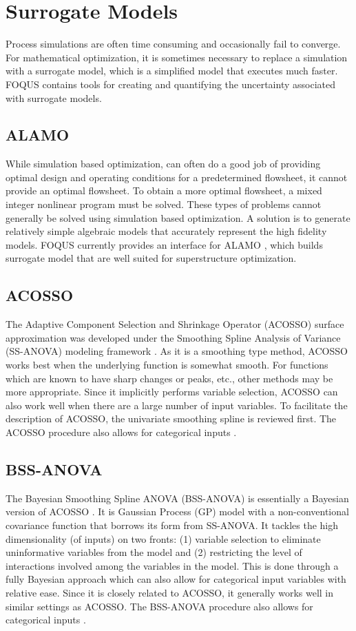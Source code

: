 \section{Surrogate Models}

Process simulations are often time consuming and occasionally fail to converge. For mathematical optimization, it is sometimes necessary to replace a simulation with a surrogate model, which is a simplified model that executes much faster. FOQUS contains tools for creating and quantifying the uncertainty associated with surrogate models.

\subsection{ALAMO}
While simulation based optimization, can often do a good job of providing optimal design and operating conditions for a predetermined flowsheet, it cannot provide an optimal flowsheet.  To obtain a more optimal flowsheet, a mixed integer nonlinear program must be solved. These types of problems cannot generally be solved using simulation based optimization. A solution is to generate relatively simple algebraic models that accurately represent the high fidelity models. FOQUS currently provides an interface for ALAMO \citep{Cozad_2014}, which builds surrogate model that are well suited for superstructure optimization.

\subsection{ACOSSO}
The Adaptive Component Selection and Shrinkage Operator (ACOSSO) surface approximation was developed under the Smoothing Spline Analysis of Variance (SS-ANOVA) modeling framework \citep{Storlie_2011}. As it is a smoothing type method, ACOSSO works best when the underlying function is somewhat smooth. For functions which are known to have sharp changes or peaks, etc., other methods may be more appropriate. Since it implicitly performs variable selection, ACOSSO can also work well when there are a large number of input variables. To facilitate the description of ACOSSO, the univariate smoothing spline is reviewed first. The ACOSSO procedure also allows for categorical inputs \citep{Storlie_2013}.

\subsection{BSS-ANOVA}
The Bayesian Smoothing Spline ANOVA (BSS-ANOVA) is essentially a Bayesian version of ACOSSO \citep{Reich_2009}. It is Gaussian Process (GP) model with a non-conventional covariance function that borrows its form from SS-ANOVA. It tackles the high dimensionality (of inputs) on two fronts: (1) variable selection to eliminate uninformative variables from the model and (2) restricting the level of interactions involved among the variables in the model. This is done through a fully Bayesian approach which can also allow for categorical input variables with relative ease. Since it is closely related to ACOSSO, it generally works well in similar settings as ACOSSO. The BSS-ANOVA procedure also allows for categorical inputs \citep{Storlie_2013}.
